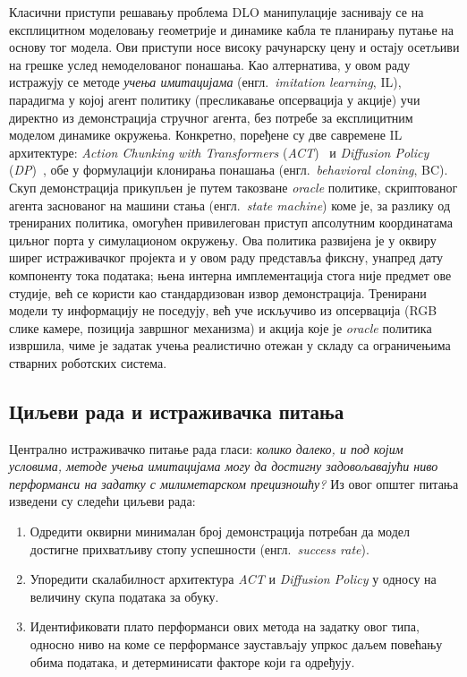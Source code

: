 \documentclass[12pt, a4paper]{article}
\begin{document}
Класични приступи решавању проблема DLO манипулације заснивају се на експлицитном моделовању геометрије и динамике кабла те планирању путање на основу тог модела.
Ови приступи носе високу рачунарску цену и остају осетљиви на грешке услед немоделованог понашања.
Као алтернатива, у овом раду истражују се методе \textit{учења имитацијама} (енгл.\ \textit{imitation learning}, IL), парадигма у којој агент политику (пресликавање опсервација у акције) учи директно из демонстрација стручног агента, без потребе за експлицитним моделом динамике окружења.
Конкретно, поређене су две савремене IL архитектуре: \textit{Action Chunking with Transformers} (\textit{ACT})~\cite{zhao2023act} и \textit{Diffusion Policy} (\textit{DP})~\cite{chi2023diffusionpolicy}, обе у формулацији клонирања понашања (енгл.\ \textit{behavioral cloning}, BC).
Скуп демонстрација прикупљен је путем такозване \textit{oracle} политике, скриптованог агента заснованог на машини стања (енгл.\ \textit{state machine}) коме је, за разлику од тренираних политика, омогућен привилегован приступ апсолутним координатама циљног порта у симулационом окружењу.
Ова политика развијена је у оквиру ширег истраживачког пројекта и у овом раду представља фиксну, унапред дату компоненту тока података; њена интерна имплементација стога није предмет ове студије, већ се користи као стандардизован извор демонстрација.
Тренирани модели ту информацију не поседују, већ уче искључиво из опсервација (RGB слике камере, позиција завршног механизма) и акција које је \textit{oracle} политика извршила, чиме је задатак учења реалистично отежан у складу са ограничењима стварних роботских система.

\subsection{Циљеви рада и истраживачка питања}
\label{subsec:ciljevi}
Централно истраживачко питање рада гласи: \textit{колико далеко, и под којим условима, методе учења имитацијама могу да достигну задовољавајући ниво перформанси на задатку с милиметарском прецизношћу?}
Из овог општег питања изведени су следећи циљеви рада:
\begin{enumerate}
    \item[\textbf{Ц1.}] Одредити оквирни минималан број демонстрација потребан да модел достигне прихватљиву стопу успешности (енгл.\ \textit{success rate}).
    \item[\textbf{Ц2.}] Упоредити скалабилност архитектура \textit{ACT} и \textit{Diffusion Policy} у односу на величину скупа података за обуку.
    \item[\textbf{Ц3.}] Идентификовати плато перформанси ових метода на задатку овог типа, односно ниво на коме се перформансе заустављају упркос даљем повећању обима података, и детерминисати факторе који га одређују.
\end{enumerate}
\end{document}
